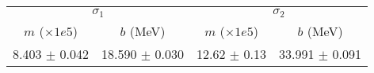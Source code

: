 \begin{tabular}{cc|cc}
\multicolumn{2}{c|}{$\sigma_1$} & \multicolumn{2}{|c}{$\sigma_2$} \\
$m$ ($\times1e5$) & $b$ (MeV) & $m$ ($\times1e5$) & $b$ (MeV) \\
\hline
8.403 $\pm$ 0.042 & 18.590 $\pm$ 0.030 & 12.62 $\pm$ 0.13 & 33.991 $\pm$ 0.091\\
\end{tabular}
